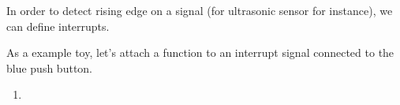 In order to detect rising edge on a signal (for ultrasonic sensor for instance), we can define interrupts. 

As a example toy, let's attach a function to an interrupt signal connected to the blue push button.


\begin{UPSTIactivite}
 \begin{enumerate}
  \item
 \end{enumerate}
\end{UPSTIactivite}
